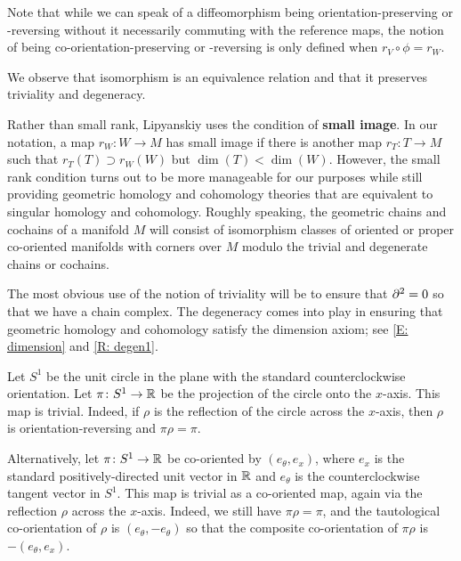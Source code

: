 Note that while we can speak of a diffeomorphism being orientation-preserving or -reversing without it necessarily commuting with the reference maps, the notion of being co-orientation-preserving or -reversing is only defined when $r_V \circ \phi = r_W$.

We observe that isomorphism is an equivalence relation and that it preserves triviality and degeneracy.

Rather than small rank, Lipyanskiy uses the condition of \textbf{small image}.
In our notation, a map $r_W \colon W \to M$ has small image if there is another map $r_T \colon T \to M$ such that $r_T(T)\supset r_W(W)$ but $\dim(T)<\dim(W)$.
However, the small rank condition turns out to be more manageable for our purposes while still providing geometric homology and cohomology theories that are equivalent to singular homology and cohomology.
Roughly speaking, the geometric chains and cochains of a manifold $M$ will consist of isomorphism classes of oriented or proper co-oriented manifolds with corners over $M$ modulo the trivial and degenerate chains or cochains.

The most obvious use of the notion of triviality will be to ensure that $\partial^2 = 0$ so that we have a chain complex.
The degeneracy comes into play in ensuring that geometric homology and cohomology satisfy the dimension axiom; see \cref{E: dimension} and \cref{R: degen1}.

\begin{example}
	Let $S^1$ be the unit circle in the plane with the standard counterclockwise orientation.
	Let $\pi \colon S^1 \to \mathbb{R}$ be the projection of the circle onto the $x$-axis.
	This map is trivial.
	Indeed, if $\rho$ is the reflection of the circle across the $x$-axis, then $\rho$ is orientation-reversing and $\pi \rho = \pi$.

	Alternatively, let $\pi \colon S^1 \to \mathbb{R}$ be co-oriented by $(e_\theta,e_x)$, where $e_x$ is the standard positively-directed unit vector in $\mathbb{R}$ and $e_\theta$ is the counterclockwise tangent vector in $S^1$.
	This map is trivial as a co-oriented map, again via the reflection $\rho$ across the $x$-axis.
	Indeed, we still have $\pi \rho = \pi$, and the tautological co-orientation of $\rho$ is $(e_\theta,-e_\theta)$ so that the composite co-orientation of $\pi\rho$ is $-(e_\theta,e_x)$.
\end{example}

